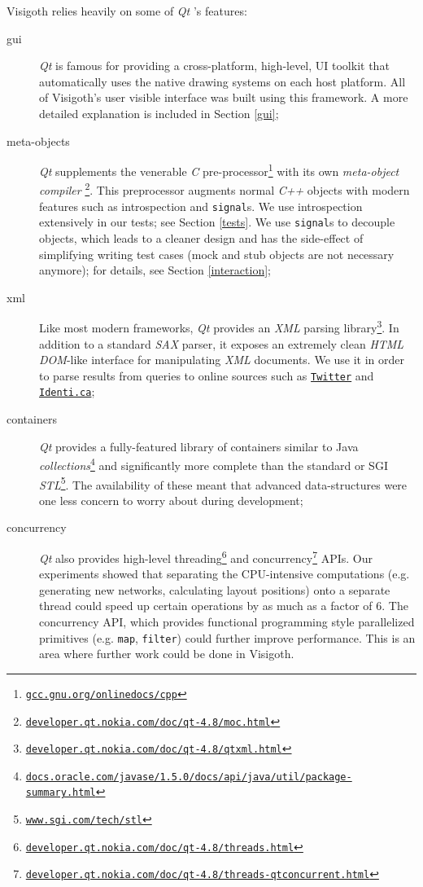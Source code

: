 \documentclass[a4paper,11pt,titlepage]{article}
\let\stdhref\href
\renewcommand{\href}[2]{\stdhref{#1}{\texttt{#2}}}
\newcommand{\code}[1]{\texttt{#1}}
\newcommand{\buzz}[1]{\emph{#1}}
\newcommand{\myhref}[1]{\href{http://#1}{#1}}
\newcommand{\Qt}{\buzz{Qt} }
\newcommand{\Twitter}{\href{http://twitter.com}{Twitter} }
\begin{document}
Visigoth relies heavily on some of \Qt's features:
\begin{description}
\item [gui] \Qt is famous for providing a cross-platform, high-level,
  UI toolkit that automatically uses the native drawing systems on
  each host platform. All of Visigoth's user visible interface was
  built using this framework. A more detailed explanation is included
  in Section \ref{gui};
\item [meta-objects] \Qt supplements the venerable \buzz{C}
  pre-processor\footnote{\myhref{gcc.gnu.org/onlinedocs/cpp}}
  with its own \buzz{meta-object
    compiler} \footnote{\myhref{developer.qt.nokia.com/doc/qt-4.8/moc.html}}.
  This preprocessor augments normal \buzz{C++} objects with modern
  features such as introspection and \code{signal}s. We use
  introspection extensively in our tests; see Section \ref{tests}. We
  use \code{signal}s to decouple objects, which leads to a cleaner
  design and has the side-effect of simplifying writing test cases
  (mock and stub objects are not necessary anymore); for details, see
  Section \ref{interaction};
\item [xml] Like most modern frameworks, \Qt provides an \buzz{XML}
  parsing
  library\footnote{\myhref{developer.qt.nokia.com/doc/qt-4.8/qtxml.html}}.
  In addition to a standard \buzz{SAX} parser, it exposes an extremely
  clean \buzz{HTML DOM}-like interface for manipulating \buzz{XML}
  documents. We use it in order to parse results from queries to
  online sources such as \Twitter and
  \href{http://identi.ca}{Identi.ca};
\item [containers] \Qt provides a fully-featured library of containers
  similar to Java
  \buzz{collections}\footnote{\myhref{docs.oracle.com/javase/1.5.0/docs/api/java/util/package-summary.html}}
  and significantly more complete than the standard or SGI
  \buzz{STL}\footnote{\myhref{www.sgi.com/tech/stl}}. The
  availability of these meant that advanced data-structures were one
  less concern to worry about during development;
\item [concurrency] \Qt also provides high-level
  threading\footnote{\myhref{developer.qt.nokia.com/doc/qt-4.8/threads.html}}
  and
  concurrency\footnote{\myhref{developer.qt.nokia.com/doc/qt-4.8/threads-qtconcurrent.html}}
  APIs. Our experiments showed that separating the CPU-intensive
  computations (e.g. generating new networks, calculating layout
  positions) onto a separate thread could speed up certain operations
  by as much as a factor of $6$. The concurrency API, which provides
  functional programming style parallelized primitives
  (e.g. \code{map}, \code{filter}) could further improve performance.
  This is an area where further work could be done in Visigoth.
\end{description}
\end{document}
